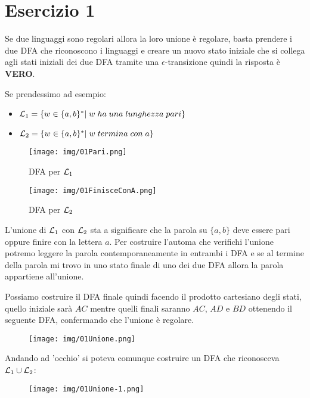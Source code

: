 \documentclass[11pt]{article}
\begin{document}
\section*{Esercizio 1}
Se due linguaggi sono regolari allora la loro unione è regolare, 
basta prendere i due DFA che riconoscono i linguaggi e creare un nuovo
stato iniziale che si collega agli stati iniziali dei due DFA tramite
una $\epsilon$-transizione quindi la risposta è \textbf{VERO}.
\begin{tcolorbox}[colframe=orange!70!black, colback=orange!10!white, title=\textbf{\textit{Nota \sout{inutile ai fini dell'esercizio}:}}]
Se prendessimo ad esempio:
\begin{itemize}
  \item ${\cal L}_1 = \{w \in \{a,b\}^*|\;w\;ha\;una\;lunghezza\;pari\}$  
  \item ${\cal L}_2 = \{w \in \{a,b\}^*|\;w\;termina\;con\;a\}$  
\end{itemize}
\begin{multicols}{2}
  \begin{figure}[H]
  \centering
    \texttt{[image: img/01Pari.png]}
    \label{fig:01-DFA-pari}
    \caption*{DFA per ${\cal L}_1$}
  \end{figure}
  \begin{figure}[H]
  \centering
    \texttt{[image: img/01FinisceConA.png]}
    \label{fig:01-DFA-finisce-con-a}
    \caption*{DFA per ${\cal L}_2$}
  \end{figure}
\end{multicols}
L'unione di  ${\cal L}_1$ con  ${\cal L}_2$ sta a significare che la 
parola su $\{a, b\}$ deve essere pari oppure finire con la lettera $a$.
Per costruire l'automa che verifichi l'unione potremo leggere la parola
contemporaneamente in entrambi i DFA e se al termine della parola mi 
trovo in uno stato finale di uno dei due DFA allora la parola appartiene
all'unione.

Possiamo costruire il DFA finale quindi facendo il prodotto cartesiano
degli stati, quello iniziale sarà $AC$ mentre quelli finali saranno 
$AC$, $AD$ e $BD$ ottenendo il seguente DFA, confermando che l'unione 
è regolare.
\begin{figure}[H]
  \centering
  \texttt{[image: img/01Unione.png]}
  \label{fig:01-DFA-unione}
\end{figure}
\noindent Andando ad 'occhio' si poteva comunque costruire un DFA 
che riconosceva ${\cal L}_1 \cup {\cal L}_2$:
\begin{figure}[H]
  \centering
  \texttt{[image: img/01Unione-1.png]}
  \label{fig:01-DFA-unione-1}
\end{figure} 
\end{tcolorbox}
\end{document}
